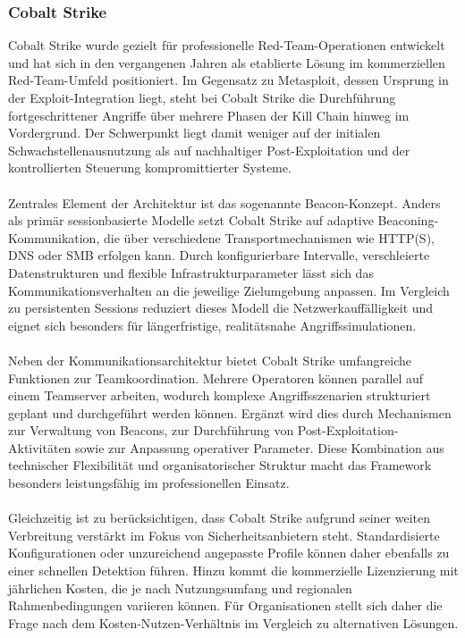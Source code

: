 \subsubsection{Cobalt Strike}
Cobalt Strike wurde gezielt für professionelle Red-Team-Operationen entwickelt und hat sich in den vergangenen Jahren als etablierte Lösung im kommerziellen Red-Team-Umfeld positioniert. 
Im Gegensatz zu Metasploit, dessen Ursprung in der Exploit-Integration liegt, steht bei Cobalt Strike die Durchführung fortgeschrittener Angriffe über mehrere Phasen der Kill Chain hinweg im Vordergrund. 
Der Schwerpunkt liegt damit weniger auf der initialen Schwachstellenausnutzung als auf nachhaltiger Post-Exploitation und der kontrollierten Steuerung kompromittierter Systeme.
\\\\
Zentrales Element der Architektur ist das sogenannte Beacon-Konzept. 
Anders als primär sessionbasierte Modelle setzt Cobalt Strike auf adaptive Beaconing-Kommunikation, die über verschiedene Transportmechanismen wie HTTP(S), DNS oder SMB erfolgen kann. 
Durch konfigurierbare Intervalle, verschleierte Datenstrukturen und flexible Infrastrukturparameter lässt sich das Kommunikationsverhalten an die jeweilige Zielumgebung anpassen. 
Im Vergleich zu persistenten Sessions reduziert dieses Modell die Netzwerkauffälligkeit und eignet sich besonders für längerfristige, realitätsnahe Angriffssimulationen.
\\\\
Neben der Kommunikationsarchitektur bietet Cobalt Strike umfangreiche Funktionen zur Teamkoordination. 
Mehrere Operatoren können parallel auf einem Teamserver arbeiten, wodurch komplexe Angriffsszenarien strukturiert geplant und durchgeführt werden können. 
Ergänzt wird dies durch Mechanismen zur Verwaltung von Beacons, zur Durchführung von Post-Exploitation-Aktivitäten sowie zur Anpassung operativer Parameter. 
Diese Kombination aus technischer Flexibilität und organisatorischer Struktur macht das Framework besonders leistungsfähig im professionellen Einsatz.
\\\\
Gleichzeitig ist zu berücksichtigen, dass Cobalt Strike aufgrund seiner weiten Verbreitung verstärkt im Fokus von Sicherheitsanbietern steht. 
Standardisierte Konfigurationen oder unzureichend angepasste Profile können daher ebenfalls zu einer schnellen Detektion führen. 
Hinzu kommt die kommerzielle Lizenzierung mit jährlichen Kosten, die je nach Nutzungsumfang und regionalen Rahmenbedingungen variieren können. 
Für Organisationen stellt sich daher die Frage nach dem Kosten-Nutzen-Verhältnis im Vergleich zu alternativen Lösungen.
